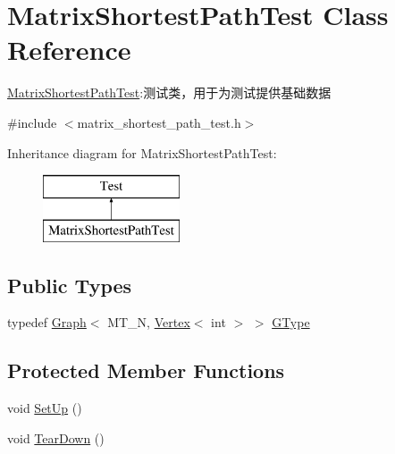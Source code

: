 \hypertarget{class_matrix_shortest_path_test}{}\section{Matrix\+Shortest\+Path\+Test Class Reference}
\label{class_matrix_shortest_path_test}


\hyperlink{class_matrix_shortest_path_test}{Matrix\+Shortest\+Path\+Test}\+:测试类，用于为测试提供基础数据  




{\ttfamily \#include $<$matrix\+\_\+shortest\+\_\+path\+\_\+test.\+h$>$}

Inheritance diagram for Matrix\+Shortest\+Path\+Test\+:\begin{figure}[H]
\begin{center}
\leavevmode
\includegraphics[height=2.000000cm]{class_matrix_shortest_path_test}
\end{center}
\end{figure}
\subsection*{Public Types}
\begin{DoxyCompactItemize}
\item 
typedef \hyperlink{struct_introduction_to_algorithm_1_1_graph_algorithm_1_1_graph}{Graph}$<$ M\+T\+\_\+\+N, \hyperlink{struct_introduction_to_algorithm_1_1_graph_algorithm_1_1_vertex}{Vertex}$<$ int $>$ $>$ \hyperlink{class_matrix_shortest_path_test_afa4c36c0b2a1b6974b44ba02e91f82ef}{G\+Type}
\end{DoxyCompactItemize}
\subsection*{Protected Member Functions}
\begin{DoxyCompactItemize}
\item 
void \hyperlink{class_matrix_shortest_path_test_ac368aa3abba1f53406aca6232ad3b45f}{Set\+Up} ()
\item 
void \hyperlink{class_matrix_shortest_path_test_a9087eff691e1d93e11c16b9ad0ed3a5d}{Tear\+Down} ()
\end{DoxyCompactItemize}
